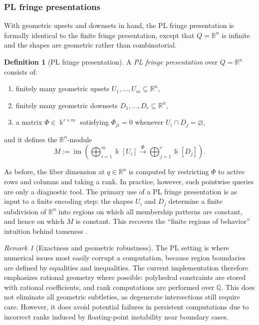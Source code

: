 \documentclass{article}
\newcommand{\kk}{\Bbbk}
\newcommand{\<}{\langle}
\renewcommand{\>}{\rangle}
\DeclareMathOperator{\im}{im}
\theoremstyle{definition}
\newtheorem{defn}[theorem]{Definition}
\theoremstyle{remark}
\newtheorem*{remark}{Remark}
\begin{document}
	\subsubsection*{PL fringe presentations}
	
	With geometric upsets and downsets in hand, the PL fringe presentation is formally identical to the finite fringe
	presentation, except that $Q=\mathbb{R}^n$ is infinite and the shapes are geometric rather than combinatorial.
	
	\begin{defn}[PL fringe presentation]\label{def:pl-fringe-presentation}
		A \emph{PL fringe presentation} over $Q=\mathbb{R}^n$ consists of:
		\begin{enumerate}[label=(\roman*)]
			\item finitely many geometric upsets $U_1,\dots,U_m\subseteq\mathbb{R}^n$,
			\item finitely many geometric downsets $D_1,\dots,D_r\subseteq\mathbb{R}^n$,
			\item a matrix $\Phi\in\kk^{r\times m}$ satisfying $\Phi_{ji}=0$ whenever $U_i\cap D_j=\varnothing$,
		\end{enumerate}
		and it defines the $\mathbb{R}^n$-module
		\[
		M := \im\!\left(\bigoplus_{i=1}^m \kk[U_i] \xrightarrow{\ \Phi\ } \bigoplus_{j=1}^r \kk[D_j]\right).
		\]
	\end{defn}
	
	As before, the fiber dimension at $q\in\mathbb{R}^n$ is computed by restricting $\Phi$ to active rows and columns and
	taking a rank.  In practice, however, such pointwise queries are only a diagnostic tool.  The primary use of a PL
	fringe presentation is as input to a finite encoding step: the shapes $U_i$ and $D_j$ determine a finite subdivision of
	$\mathbb{R}^n$ into regions on which all membership patterns are constant, and hence on which $M$ is constant.  This
	recovers the ``finite regions of behavior'' intuition behind tameness \cite{Mil20}.
	
	\begin{remark}[Exactness and geometric robustness]
		The PL setting is where numerical issues most easily corrupt a computation, because region boundaries are defined by equalities and inequalities.  The current implementation therefore emphasizes rational geometry where possible: polyhedral constraints are stored with rational coefficients, and rank computations are performed over $\mathbb{Q}$.  This does not eliminate all geometric subtleties, as degenerate intersections still require care. However, it does avoid potential failures in persistent computations due to incorrect ranks induced by floating-point instability near boundary cases.
	\end{remark}
	
\end{document}
